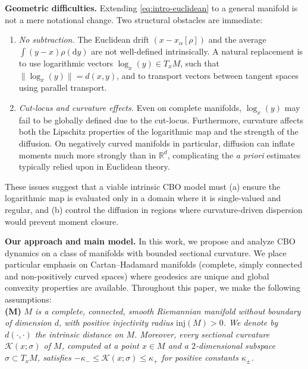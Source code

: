 \documentclass[11pt]{amsart}
\newcommand{\dm}{d} %
\newcommand{\dist}{d}%
\newcommand{\inj}{\mathrm{inj}}%
\begin{document}
\medskip

\noindent\textbf{Geometric difficulties.}
Extending \eqref{eq:intro-euclidean} to a general manifold is not a mere notational change. Two structural obstacles are immediate:

\begin{enumerate}
\item \emph{No subtraction.} The Euclidean drift $(x-x_\alpha[\rho])$ and the average $\int (y-x)\rho(\mathrm{d}y)$ are not well-defined intrinsically. A natural replacement is to use logarithmic vectors $\log_x(y)\in T_xM$, such that $\|\log_x(y)\|=d(x,y)$, and to transport vectors between tangent spaces using parallel transport.
\item \emph{Cut-locus and curvature effects.} Even on complete manifolds, $\log_x(y)$ may fail to be globally defined due to the cut-locus. Furthermore, curvature affects both the Lipschitz properties of the logarithmic map and the strength of the diffusion. On negatively curved manifolds in particular, diffusion can inflate moments much more strongly than in $\mathbb{R}^d$, complicating the \emph{a priori} estimates typically relied upon in Euclidean theory.
\end{enumerate}

These issues suggest that a viable intrinsic CBO model must (a) ensure the logarithmic map is evaluated only in a domain where it is single-valued and regular, and (b) control the diffusion in regions where curvature-driven dispersion would prevent moment closure.

\medskip

\noindent\textbf{Our approach and main model.}
In this work, we propose and analyze CBO dynamics on a class of manifolds with bounded sectional curvature. We place particular emphasis on Cartan--Hadamard manifolds (complete, simply connected and non-positively curved spaces) where geodesics are unique and global convexity properties are available. Throughout this paper, we make the following assumptions:\\

\noindent\textbf{(M)} \textit{$M$ is a complete, connected, smooth Riemannian manifold without boundary of dimension $\dm$, with positive injectivity radius $\inj(M)>0$. We denote by $\dist(\cdot,\cdot)$ the intrinsic distance on $M$. Moreover, every sectional curvature $\mathcal{K}(x;\sigma)$ of $M$, computed at a point $x\in M$ and a $2$-dimensional subspace $\sigma\subset T_xM$, satisfies $-\kappa_- \leq \mathcal{K}(x;\sigma) \leq \kappa_+$ for positive constants $\kappa_\pm$.}\\
\end{document}
